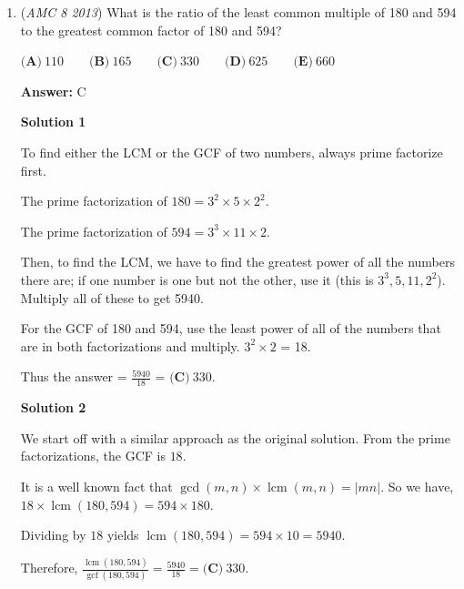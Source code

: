 \begin{enumerate}
 1, 2, 4, 8, 16, 32, 64, 128, 256, 512, 1024.

 Since 1024 is larger than 1000, now we just have to count the numbers. There are 11, thus, the answer is $\boxed{\textbf{(C)}\ 11^{\text{th}}}$

 \textbf{Quick Solution} You could just know that the first multiple of 2 that goes over 1000 meters (1 km)would be 1024 so the answer would be $\boxed{\textbf{(C)}\ 11^{\text{th}}}$ because $2^{\text{11}}$ is already known.

 


	\item (\textit{AMC 8 2013}) What is the ratio of the least common multiple of 180 and 594 to the greatest common factor of 180 and 594?


 $\textbf{(A)}\ 110 \qquad \textbf{(B)}\ 165 \qquad \textbf{(C)}\ 330 \qquad \textbf{(D)}\ 625 \qquad \textbf{(E)}\ 660$

 \textbf{Answer: }C



\textbf{Solution 1}

To find either the LCM or the GCF of two numbers, always prime factorize first.

 The prime factorization of $180 = 3^2 \times  5 \times 2^2$.

 The prime factorization of $594 = 3^3 \times  11 \times 2$.

 Then, to find the LCM, we have to find the greatest power of all the numbers there are; if one number is one but not the other, use it (this is $3^3, 5, 11, 2^2$). Multiply all of these to get 5940. 

 For the GCF of 180 and 594, use the least power of all of the numbers that are in both factorizations and multiply. $3^2 \times 2$ = 18.

 Thus the answer = $\frac{5940}{18}$ = $\boxed{\textbf{(C)}\ 330}$.

 



\textbf{Solution 2}

We start off with a similar approach as the original solution. From the prime factorizations, the GCF is $18$.

 It is a well known fact that $\gcd(m,n)\times \operatorname{lcm}(m,n)=|mn|$. So we have, $18\times \operatorname{lcm} (180,594)=594\times 180$.

 Dividing by $18$ yields $\operatorname{lcm} (180,594)=594\times 10=5940$.

 Therefore, $\frac{\operatorname{lcm} (180,594)}{\operatorname{gcf}(180,594)}=\frac{5940}{18}=\boxed{\textbf{(C)}\ 330}$.


\end{enumerate}
